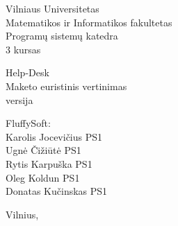 \begin{titlepage}
    \begin{center}

        {\large
            Vilniaus Universitetas \\
            Matematikos ir Informatikos fakultetas \\
            Programų sistemų katedra \\
            3 kursas
        }

        \vspace{\fill}

        {\huge
            Help-Desk
        } \\[0.5cm]
        {\large
            Maketo euristinis vertinimas \\
            \versionString{} versija
        }

        \vspace{3cm}

        \begin{flushright}
            \begin{minipage}{0.4\textwidth}
                FluffySoft: \\
                Karolis Jocevičius PS1\\
                Ugnė Čižiūtė PS1\\
                Rytis Karpuška PS1\\
                Oleg Koldun PS1\\
                Donatas Kučinskas PS1
            \end{minipage}
        \end{flushright}

        \vspace{\fill}

        {\large Vilnius, \the\year}

    \end{center}
\end{titlepage}
